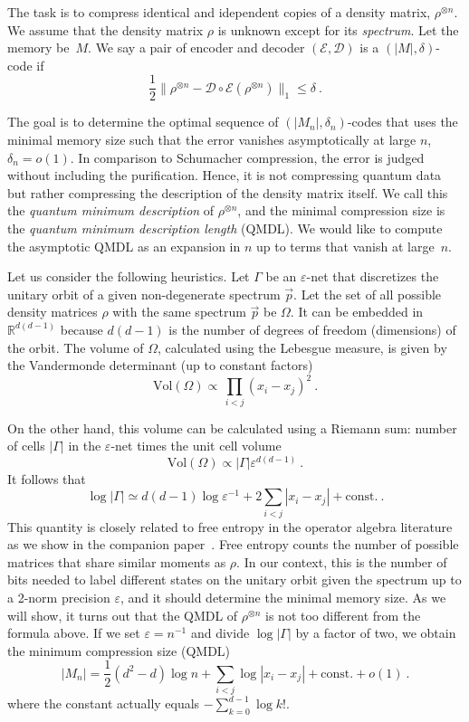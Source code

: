 \documentclass[a4paper,onecolumn,11pt]{quantumarticle}
\def\eps{\varepsilon}
\def\D{\mathcal{D}}
\def\E{\mathcal{E}}
\begin{document}
The task is to compress identical and idependent copies of a density matrix, $\rho^{\otimes n}$. We assume that the density matrix $\rho$ is unknown except for its \emph{spectrum}. Let the memory be~$M$. We say a pair of encoder and decoder $(\E,\D)$ is a $(|M|,\delta)$-code if
\begin{equation}\label{eq:error}
   \frac12 \|\rho^{\otimes n}-\D\circ\E(\rho^{\otimes n})\|_1\le\delta\ .
\end{equation} 

The goal is to determine the optimal sequence of $(|M_n|,\delta_n)$-codes that uses the minimal memory size such that the error vanishes asymptotically at large $n$, $\delta_n=o(1)$. In comparison to Schumacher compression, the error is judged without including the purification. Hence, it is not compressing quantum data but rather compressing the description of the density matrix itself. We call this the \emph{quantum minimum description} of $\rho^{\otimes n}$, and the minimal compression size is the \emph{quantum minimum description length} (QMDL). We would like to compute the asymptotic QMDL as an expansion in $n$ up to terms that vanish at large~$n$. 

Let us consider the following heuristics. Let $\Gamma$ be an $\eps$-net that discretizes the unitary orbit of a given non-degenerate spectrum $\vec p$. Let the set of all possible density matrices $\rho$ with the same spectrum $\vec p$ be $\Omega$. It can be embedded in $\mathbb R^{d(d-1)}$ because $d(d-1)$ is the number of degrees of freedom (dimensions) of the orbit.  The volume of $\Omega$, calculated using the Lebesgue measure, is given by the Vandermonde determinant (up to constant factors)
\[
    \mathrm{Vol}(\Omega) \propto\, \prod_{i<j} (x_i-x_j)^2\ .
\]

On the other hand, this volume can be calculated using a Riemann sum: number of cells $|\Gamma|$ in the $\eps$-net times the unit cell volume
\[
    \mathrm{Vol}(\Omega)\propto |\Gamma| \eps^{d(d-1)}\ .
\]
It follows that 
\[
    \log|\Gamma| \simeq d(d-1)\log\eps^{-1} +2\sum_{i<j} |x_i-x_j| +\mathrm{const.}\ .
\]
This quantity is closely related to free entropy in the operator algebra literature~\cite{voiculescu1993analogues,voiculescu1994analogues,voiculescu2002free} as we show in the companion paper~\cite{paper1}. Free entropy counts the number of possible matrices that share similar moments as $\rho$. In our context, this is the number of bits needed to label different states on the unitary orbit given the spectrum up to a 2-norm precision $\eps$, and it should determine the minimal memory size. As we will show, it turns out that the QMDL of $\rho^{\otimes n}$ is not too different from the formula above. If we set $\eps=n^{-1}$ and divide $\log|\Gamma|$ by a factor of two, we obtain the minimum compression size (QMDL) 
\begin{equation}
 |M_n| = \frac12(d^2-d)\log n +\sum_{i<j}\log|x_i-x_j| + \mathrm{const.}+o(1)\ .
\end{equation}
where the constant actually equals $-\sum_{k=0}^{d-1}\log k!$.
\end{document}
